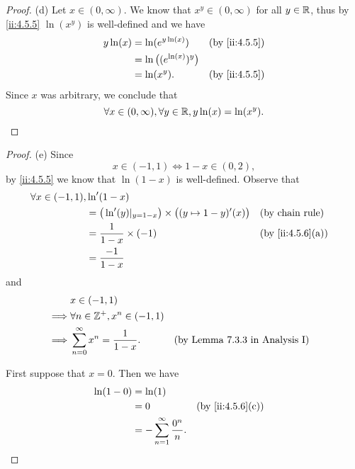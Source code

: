 \begin{proof}{(d)}
  Let \(x \in (0, \infty)\).
  We know that \(x^y \in (0, \infty)\) for all \(y \in \mathbb{R}\), thus by \cref{ii:4.5.5} \(\ln(x^y)\) is well-defined and we have
  \begin{align*}
    y \ln(x) & = \ln(e^{y \ln(x)})             &  & \by{ii:4.5.5} \\
             & = \ln\big((e^{\ln(x)})^{y}\big)                    \\
             & = \ln(x^y).                     &  & \by{ii:4.5.5}
  \end{align*}
  Since \(x\) was arbitrary, we conclude that
  \[
    \forall x \in (0, \infty), \forall y \in \mathbb{R}, y \ln(x) = \ln(x^y).
  \]
\end{proof}

\begin{proof}{(e)}
  Since
  \[
    x \in (-1, 1) \iff 1 - x \in (0, 2),
  \]
  by \cref{ii:4.5.5} we know that \(\ln(1 - x)\) is well-defined.
  Observe that
  \begin{align*}
    \forall x \in (-1, 1), & \ln'(1 - x)                                                                                         \\
                           & = \big(\ln'(y)|_{y = 1 - x}\big) \times \big((y \mapsto 1 - y)'(x)\big) &  & \text{(by chain rule)} \\
                           & = \dfrac{1}{1 - x} \times (-1)                                          &  & \by{ii:4.5.6}[a]       \\
                           & = \dfrac{-1}{1 - x}
  \end{align*}
  and
  \begin{align*}
             & x \in (-1, 1)                                                                          \\
    \implies & \forall n \in \mathbb{Z}^+, x^n \in (-1, 1)                                                    \\
    \implies & \sum_{n = 0}^\infty x^n = \dfrac{1}{1 - x}. &  & \text{(by Lemma 7.3.3 in Analysis I)}
  \end{align*}

  First suppose that \(x = 0\).
  Then we have
  \begin{align*}
    \ln(1 - 0) & = \ln(1)                                                      \\
               & = 0                                     &  & \by{ii:4.5.6}[c] \\
               & = - \sum_{n = 1}^\infty \dfrac{0^n}{n}.
  \end{align*}


\end{proof}

